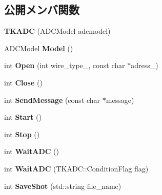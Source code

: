 \subsection*{公開メンバ関数}
\begin{DoxyCompactItemize}
\item 
\mbox{\label{class_t_k_a_d_c_a1c0a93b410e2803b620b58a68602ddb8}} 
{\bfseries T\+K\+A\+DC} (A\+D\+C\+Model adcmodel)
\item 
\mbox{\label{class_t_k_a_d_c_ae9f969478ee09be58f48b2acaca6b18e}} 
A\+D\+C\+Model {\bfseries Model} ()
\item 
\mbox{\label{class_t_k_a_d_c_a325adb86439b5b155b5d39fe6bbccdd3}} 
int {\bfseries Open} (int wire\+\_\+type\+\_\+, const char $\ast$adress\+\_\+)
\item 
\mbox{\label{class_t_k_a_d_c_a35b9419768e76a1e2ae038490276fd54}} 
int {\bfseries Close} ()
\item 
\mbox{\label{class_t_k_a_d_c_a263c827670741ec9346bab57dd2014b5}} 
int {\bfseries Send\+Message} (const char $\ast$message)
\item 
\mbox{\label{class_t_k_a_d_c_a3a72fc4842cf2d631a2125bc0a44e8b8}} 
int {\bfseries Start} ()
\item 
\mbox{\label{class_t_k_a_d_c_a15e1a4d09c33442b8493c55d4bdcb46e}} 
int {\bfseries Stop} ()
\item 
\mbox{\label{class_t_k_a_d_c_a756ea455d92a0ff748471319f00802f7}} 
int {\bfseries Wait\+A\+DC} ()
\item 
\mbox{\label{class_t_k_a_d_c_a4fcfd8a9e1a211a45146b06b4fe5e62f}} 
int {\bfseries Wait\+A\+DC} (T\+K\+A\+D\+C\+::\+Condition\+Flag flag)
\item 
\mbox{\label{class_t_k_a_d_c_a203501518ba49a7595572c5295d754ed}} 
int {\bfseries Save\+Shot} (std\+::string file\+\_\+name)
\item 
\mbox{\label{class_t_k_a_d_c_a36ba7240885559c96262c0e85dcd5731}} 

\end{DoxyCompactItemize}
